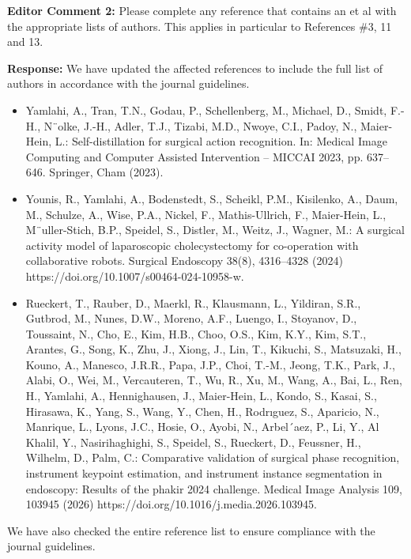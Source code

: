 \documentclass{article}
\begin{document}
\vspace{4mm}
\textbf{Editor Comment 2:} 
Please complete any reference that contains an et al with the appropriate lists of authors. This applies in particular to References \#3, 11 and 13.

\textbf{Response:} 
We have updated the affected references to include the full list of authors in accordance with the journal guidelines.

\begin{itemize}
\item[3] Yamlahi, A., Tran, T.N., Godau, P., Schellenberg, M., Michael, D., Smidt, F.-H., N¨olke, J.-H., Adler, T.J., Tizabi, M.D., Nwoye, C.I., Padoy, N., Maier-Hein, L.: Self-distillation for surgical action recognition. In: Medical Image Computing and Computer Assisted Intervention – MICCAI 2023, pp. 637–646. Springer, Cham (2023).
\item[11] Younis, R., Yamlahi, A., Bodenstedt, S., Scheikl, P.M., Kisilenko, A., Daum, M., Schulze, A., Wise, P.A., Nickel, F., Mathis-Ullrich, F., Maier-Hein, L., M¨uller-Stich, B.P., Speidel, S., Distler, M., Weitz, J., Wagner, M.: A surgical activity model of laparoscopic cholecystectomy for co-operation with collaborative robots. Surgical Endoscopy 38(8), 4316–4328 (2024) https://doi.org/10.1007/s00464-024-10958-w. 
\item[13] Rueckert, T., Rauber, D., Maerkl, R., Klausmann, L., Yildiran, S.R., Gutbrod,
M., Nunes, D.W., Moreno, A.F., Luengo, I., Stoyanov, D., Toussaint, N., Cho, E., Kim, H.B., Choo, O.S., Kim, K.Y., Kim, S.T., Arantes, G., Song, K., Zhu, J., Xiong, J., Lin, T., Kikuchi, S., Matsuzaki, H., Kouno, A., Manesco, J.R.R., Papa, J.P., Choi, T.-M., Jeong, T.K., Park, J., Alabi, O., Wei, M., Vercauteren, T., Wu, R., Xu, M., Wang, A., Bai, L., Ren, H., Yamlahi, A., Hennighausen, J.,
Maier-Hein, L., Kondo, S., Kasai, S., Hirasawa, K., Yang, S., Wang, Y., Chen, H., Rodrıguez, S., Aparicio, N., Manrique, L., Lyons, J.C., Hosie, O., Ayobi, N., Arbel´aez, P., Li, Y., Al Khalil, Y., Nasirihaghighi, S., Speidel, S., Rueckert, D., Feussner, H., Wilhelm, D., Palm, C.: Comparative validation of surgical phase recognition, instrument keypoint estimation, and instrument instance segmentation in endoscopy: Results of the phakir 2024 challenge. Medical Image Analysis 109, 103945 (2026) https://doi.org/10.1016/j.media.2026.103945. 
\end{itemize}


\vspace{4mm}
We have also checked the entire reference list to ensure compliance with the journal guidelines.



\vspace{4mm}
\end{document}
